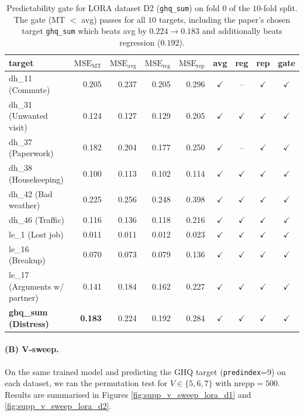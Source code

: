 \documentclass[AMA,Times1COL]{WileyNJDv5} %
\begin{document}
\begin{table}[ht]
\centering
\small
\begin{tabular}{l r r r r c c c c}
\toprule
target & $\mathrm{MSE}_{\mathrm{MT}}$ & $\mathrm{MSE}_{\mathrm{avg}}$ & $\mathrm{MSE}_{\mathrm{reg}}$ & $\mathrm{MSE}_{\mathrm{rep}}$ & avg & reg & rep & gate \\
\midrule
dh\_11 (Commute) & 0.205 & 0.237 & 0.205 & 0.296 & $\checkmark$ & -- & $\checkmark$ & $\checkmark$ \\
dh\_31 (Unwanted visit) & 0.124 & 0.127 & 0.129 & 0.205 & $\checkmark$ & $\checkmark$ & $\checkmark$ & $\checkmark$ \\
dh\_37 (Paperwork) & 0.182 & 0.204 & 0.177 & 0.250 & $\checkmark$ & -- & $\checkmark$ & $\checkmark$ \\
dh\_38 (Housekeeping) & 0.100 & 0.113 & 0.102 & 0.114 & $\checkmark$ & $\checkmark$ & $\checkmark$ & $\checkmark$ \\
dh\_42 (Bad weather) & 0.225 & 0.256 & 0.248 & 0.398 & $\checkmark$ & $\checkmark$ & $\checkmark$ & $\checkmark$ \\
dh\_46 (Traffic) & 0.116 & 0.136 & 0.118 & 0.216 & $\checkmark$ & $\checkmark$ & $\checkmark$ & $\checkmark$ \\
le\_1 (Lost job) & 0.011 & 0.011 & 0.012 & 0.023 & $\checkmark$ & $\checkmark$ & $\checkmark$ & $\checkmark$ \\
le\_16 (Breakup) & 0.070 & 0.073 & 0.079 & 0.136 & $\checkmark$ & $\checkmark$ & $\checkmark$ & $\checkmark$ \\
le\_17 (Arguments w/ partner) & 0.141 & 0.184 & 0.162 & 0.227 & $\checkmark$ & $\checkmark$ & $\checkmark$ & $\checkmark$ \\
\textbf{ghq\_sum (Distress)} & \textbf{0.183} & 0.224 & 0.192 & 0.284 & $\checkmark$ & $\checkmark$ & $\checkmark$ & \textbf{$\checkmark$} \\
\bottomrule
\end{tabular}
\caption{Predictability gate for LORA dataset D2 (\texttt{ghq\_sum}) on fold $0$ of the $10$-fold split. The gate (MT $<$ avg) passes for all $10$ targets, including the paper's chosen target \texttt{ghq\_sum} which beats avg by $0.224 \to 0.183$ and additionally beats regression ($0.192$).}
\label{tab:supp_gate_lora_d2}
\end{table}

\paragraph*{(B) V-sweep.} On the same trained model and predicting the GHQ target (\texttt{predindex}=9) on each dataset, we ran the permutation test for $V \in \{5, 6, 7\}$ with $\mathrm{nrepp}=500$. Results are summarised in Figures \ref{fig:supp_v_sweep_lora_d1} and \ref{fig:supp_v_sweep_lora_d2}.
\end{document}
